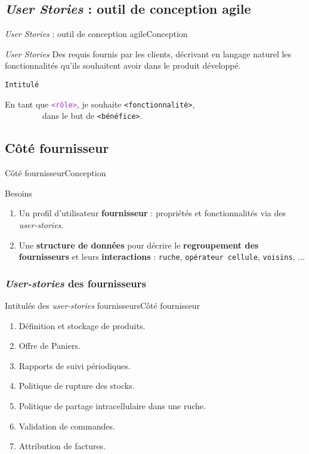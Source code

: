 \documentclass[usenames,dvipsnames]{beamer}
\begin{document}
\subsection{\protect\textit{User Stories} : outil de conception agile}
\begin{frame}{\textit{User Stories} : outil de conception agile}{Conception}
\begin{block}{\textit{User Stories}}
Des requis fournis par les clients, décrivant en langage naturel les fonctionnalités qu'ils souhaitent avoir dans le produit développé.
\end{block}

\begin{block}{\textcolor{Sepia}{\texttt{Intitulé}}}
\begin{it}
  En tant que \textcolor{DarkOrchid}{\texttt{<rôle>}}, je souhaite \textcolor{BrickRed}{\texttt{<fonctionnalité>}}, \\
  ~~~~~~~~~dans le but de \textcolor{OliveGreen}{\texttt{<bénéfice>}}.
\end{it}
\end{block}
\end{frame}

\subsection{Côté fournisseur}
\begin{frame}{Côté fournisseur}{Conception}
\begin{block}{Besoins}
\begin{enumerate}
  \item Un profil d'utilisateur \textbf{fournisseur} : propriétés et fonctionnalités via des \textit{user-stories}.
  \item Une \textbf{structure de données} pour décrire le \textbf{regroupement des fournisseurs} et leurs \textbf{interactions} : \texttt{ruche}, \texttt{opérateur cellule}, \texttt{voisins}, $\dots$
\end{enumerate}
\end{block}
\end{frame}

\subsubsection*{\protect\textit{User-stories} des fournisseurs}
\begin{frame}{Intitulés des \textit{user-stories} fournisseurs}{Côté fournisseur}
\begin{enumerate}
  \item Définition et stockage de produits.
  \item Offre de Paniers.
  \item Rapports de suivi périodiques.
  \item Politique de rupture des stocks.
  \item Politique de partage intracellulaire dans une ruche.
  \item Validation de commandes.
  \item Attribution de factures.
\end{enumerate}
\end{frame}
\end{document}
